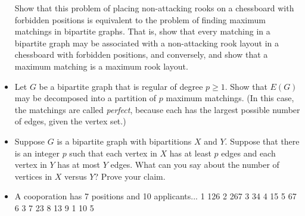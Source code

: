 \begin{itemize}
    Show that this problem of placing non-attacking rooks on a chessboard with forbidden positions is equivalent to the problem of finding maximum matchings in bipartite graphs.  That is, show that every matching in a bipartite graph may be associated with a non-attacking rook layout in a chessboard with forbidden positions, and conversely, and show that a maximum matching is a maximum rook layout.
    \item Let $G$ be a bipartite graph that is regular of degree $p\geq 1$.  Show that $E(G)$ may be decomposed into a partition of $p$ maximum matchings.  (In this case, the matchings are called \textit{perfect}, because each has the largest possible number of edges, given the vertex set.)
    \item Suppose $G$ is a bipartite graph with bipartitions $X$ and $Y$.  Suppose that there is an integer $p$ such that each vertex in $X$ has at least $p$ edges and each vertex in $Y$ has at most $Y$ edges.  What can you say about the number of vertices in $X$ versus $Y$?  Prove your claim.
    \item A cooporation has 7 positions and 10 applicants...
    1 126
    2 267
    3 34
    4 15
    5 67
    6 3
    7 23
    8 13
    9 1
    10 5

\end{itemize}
